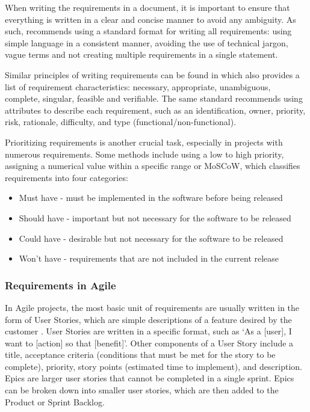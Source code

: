 When writing the requirements in a document, it is important to ensure that everything is written in a clear and concise manner to avoid any ambiguity. As such, \textcite[112]{requirements} recommends using a standard format for writing all requirements: using simple language in a consistent manner, avoiding the use of technical jargon, vague terms and not creating multiple requirements in a single statement.

Similar principles of writing requirements can be found in \textcite{requirements2} which also provides a list of requirement characteristics: necessary, appropriate, unambiguous, complete, singular, feasible and verifiable. The same standard recommends using attributes to describe each requirement, such as an identification, owner, priority, risk, rationale, difficulty, and type (functional/non-functional).

Prioritizing requirements is another crucial task, especially in projects with numerous requirements. Some methods include using a low to high priority, assigning a numerical value within a specific range or MoSCoW, which classifies requirements into four categories: 
\begin{itemize}
    \item Must have - must be implemented in the software before being released
    \item Should have - important but not necessary for the software to be released
    \item Could have - desirable but not necessary for the software to be released
    \item Won't have - requirements that are not included in the current release
\end{itemize}

\subsubsection{Requirements in Agile}

In Agile projects, the most basic unit of requirements are usually written in the form of User Stories, which are simple descriptions of a feature desired by the customer \parencite[191]{requirements}. User Stories are written in a specific format, such as `As a [user], I want to [action] so that [benefit]'. Other components of a User Story include a title, acceptance criteria (conditions that must be met for the story to be complete), priority, story points (estimated time to implement), and description. Epics are larger user stories that cannot be completed in a single sprint. Epics can be broken down into smaller user stories, which are then added to the Product or Sprint Backlog.

